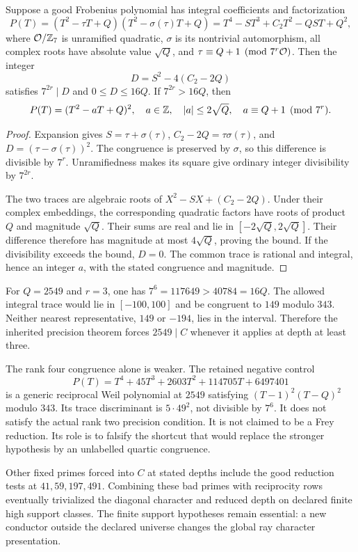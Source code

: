 \begin{lemma}\label{lem:collapse}
Suppose a good Frobenius polynomial has integral coefficients and factorization
\[
P(T)=(T^2-\tau T+Q)(T^2-\sigma(\tau)T+Q)
 =T^4-ST^3+C_2T^2-QST+Q^2,
\]
where $\mathcal O/\mathbb Z_7$ is unramified quadratic, $\sigma$ is its nontrivial automorphism, all complex roots have absolute value $\sqrt Q$, and $\tau\equiv Q+1\pmod{7^r\mathcal O}$. Then the integer
\[
D=S^2-4(C_2-2Q)
\]
satisfies $7^{2r}\mid D$ and $0\le D\le16Q$. If $7^{2r}>16Q$, then
\[
P(T)=(T^2-aT+Q)^2,
\quad a\in\mathbb Z,\quad |a|\le2\sqrt Q,
\quad a\equiv Q+1\pmod{7^r}.
\]
\end{lemma}
\begin{proof}
Expansion gives $S=\tau+\sigma(\tau)$, $C_2-2Q=\tau\sigma(\tau)$, and $D=(\tau-\sigma(\tau))^2$. The congruence is preserved by $\sigma$, so this difference is divisible by $7^r$. Unramifiedness makes its square give ordinary integer divisibility by $7^{2r}$.

The two traces are algebraic roots of $X^2-SX+(C_2-2Q)$. Under their complex embeddings, the corresponding quadratic factors have roots of product $Q$ and magnitude $\sqrt Q$. Their sums are real and lie in $[-2\sqrt Q,2\sqrt Q]$. Their difference therefore has magnitude at most $4\sqrt Q$, proving the bound. If the divisibility exceeds the bound, $D=0$. The common trace is rational and integral, hence an integer $a$, with the stated congruence and magnitude.
\end{proof}
For $Q=2549$ and $r=3$, one has $7^6=117649>40784=16Q$. The allowed integral trace would lie in $[-100,100]$ and be congruent to $149$ modulo $343$. Neither nearest representative, $149$ or $-194$, lies in the interval. Therefore the inherited precision theorem forces $2549\mid C$ whenever it applies at depth at least three.

The rank four congruence alone is weaker. The retained negative control
\[
P(T)=T^4+45T^3+2603T^2+114705T+6497401
\]
is a generic reciprocal Weil polynomial at $2549$ satisfying $(T-1)^2(T-Q)^2$ modulo $343$. Its trace discriminant is $5\cdot49^2$, not divisible by $7^6$. It does not satisfy the actual rank two precision condition. It is not claimed to be a Frey reduction. Its role is to falsify the shortcut that would replace the stronger hypothesis by an unlabelled quartic congruence.

Other fixed primes forced into $C$ at stated depths include the good reduction tests at $41,59,197,491$. Combining these bad primes with reciprocity rows eventually trivialized the diagonal character and reduced depth on declared finite high support classes. The finite support hypotheses remain essential: a new conductor outside the declared universe changes the global ray character presentation.
